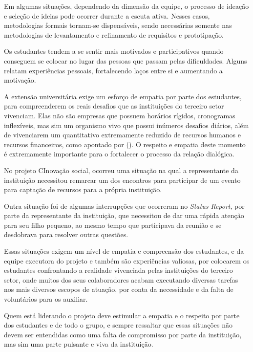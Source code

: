 Em algumas situações, dependendo da dimensão da equipe, o processo de ideação e seleção de ideias pode ocorrer durante a escuta ativa. Nesses casos, metodologias formais tornam-se dispensáveis, sendo necessárias somente nas metodologias de levantamento e refinamento de requisitos e prototipação.

Os estudantes tendem a se sentir mais motivados e participativos quando conseguem se colocar no lugar das pessoas que passam pelas dificuldades. Alguns relatam experiências pessoais, fortalecendo laços entre si e aumentando a motivação.

A extensão universitária exige um esforço de empatia por parte dos estudantes, para compreenderem os reais desafios que as instituições do terceiro setor vivenciam. Elas não são empresas que possuem horários rígidos, cronogramas inflexíveis, mas sim um organismo vivo que possui inúmeros desafios diários, além de vivenciarem um quantitativo extremamente reduzido de recursos humanos e recursos financeiros, como apontado por \citeauthor{gama2023} (\citeyear{gama2023}). O respeito e empatia deste momento é extremamente importante para o fortalecer o processo da relação dialógica.

No projeto CInovação social, ocorreu uma situação na qual a representante da instituição necessitou remarcar um dos encontros para participar de um evento para captação de recursos para a própria instituição. 

Outra situação foi de algumas interrupções que ocorreram no \textit{Status Report}, por parte da representante da instituição, que necessitou de dar uma rápida atenção para seu filho pequeno, ao mesmo tempo que participava da reunião e se desdobrava para resolver outras questões. 

Essas situações exigem um nível de empatia e compreensão dos estudantes, e da equipe executora do projeto e também são experiências valiosas, por colocarem os estudantes confrontando a realidade vivenciada pelas instituições do terceiro setor, onde muitos dos seus colaboradores acabam executando diversas tarefas nos mais diversos escopos de atuação, por conta da necessidade e da falta de voluntários para os auxiliar.

Quem está liderando o projeto deve estimular a empatia e o respeito por parte dos estudantes e de todo o grupo, e sempre ressaltar que essas situações não devem ser entendidas como uma falta de compromisso por parte da instituição, mas sim uma parte pulsante e viva da instituição.
